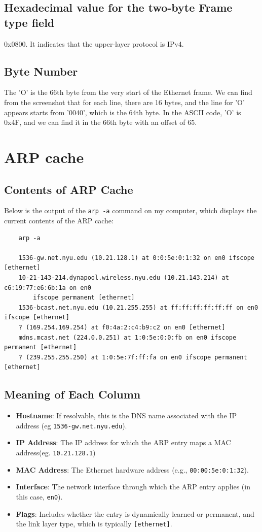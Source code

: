 \documentclass{article}
\begin{document}
\begin{CJK*}{UTF8}{gbsn}
\subsection{Hexadecimal value for the two-byte Frame type field}
0x0800. It indicates that the upper-layer protocol is IPv4.
\subsection{Byte Number}
The 'O' is the 66th byte from the very start of the Ethernet frame. We can find from the screenshot that
for each line, there are 16 bytes, and the line for 'O' appears starts from '0040', which is the 64th byte.
In the ASCII code, 'O' is 0x4F, and we can find it in the 66th byte with an offset of 65.

\section{ARP cache}
\subsection{Contents of ARP Cache}
Below is the output of the \texttt{arp -a} command on my computer, which displays the current contents of the ARP cache:

\begin{lstlisting}
    arp -a

    1536-gw.net.nyu.edu (10.21.128.1) at 0:0:5e:0:1:32 on en0 ifscope [ethernet]
    10-21-143-214.dynapool.wireless.nyu.edu (10.21.143.214) at c6:19:77:e6:6b:1a on en0 
        ifscope permanent [ethernet]
    1536-bcast.net.nyu.edu (10.21.255.255) at ff:ff:ff:ff:ff:ff on en0 ifscope [ethernet]
    ? (169.254.169.254) at f0:4a:2:c4:b9:c2 on en0 [ethernet]
    mdns.mcast.net (224.0.0.251) at 1:0:5e:0:0:fb on en0 ifscope permanent [ethernet]
    ? (239.255.255.250) at 1:0:5e:7f:ff:fa on en0 ifscope permanent [ethernet]
\end{lstlisting}

\subsection*{Meaning of Each Column}
\begin{itemize}
  \item \textbf{Hostname}: If resolvable, this is the DNS name associated with the IP address (eg \texttt{1536-gw.net.nyu.edu}).
  \item \textbf{IP Address}: The IP address for which the ARP entry maps a MAC address(eg. \texttt{10.21.128.1})
  \item \textbf{MAC Address}: The Ethernet hardware address (e.g., \texttt{00:00:5e:0:1:32}).
  \item \textbf{Interface}: The network interface through which the ARP entry applies (in this case, \texttt{en0}).
  \item \textbf{Flags}: Includes whether the entry is dynamically learned or permanent, and the link layer type, which is typically \texttt{[ethernet]}.
\end{itemize}


\end{CJK*}
\end{document}
